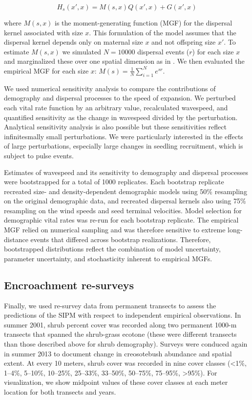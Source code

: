 \documentclass[11pt]{article}\usepackage[]{graphicx}\usepackage[usenames,dvipsnames]{xcolor}
\begin{document}
\begin{linenomath*} 
\begin{equation} 
H_{s}(x\prime,x) = M(s,x)Q(x\prime,x) + G(x\prime,x)
\end{equation} 
\end{linenomath*}

where $M(s,x)$ is the moment-generating function (MGF) for the dispersal kernel associated with size $x$.
This formulation of the model assumes that the dispersal kernel depends only on maternal size $x$ and not offspring size $x\prime$.
To estimate $M(s,x)$ we simulated $N=10000$ dispersal events ($r$) for each size $x$ and marginalized these over one spatial dimension as in \cite{lewis2006guide}.
We then evaluated the empirical MGF for each size $x$: $M(s)=\frac{1}{N} \sum_{i=1}^{N}e^{sr}$. 

We used numerical sensitivity analysis to compare the contributions of demography and dispersal processes to the speed of expansion. 
We perturbed each vital rate function by an arbitrary value, recalculated wavespeed, and quantified sensitivity as the change in wavespeed divided by the perturbation. 
Analytical sensitivity analysis is also possible \citep{ellner2016data} but these sensitivities reflect infinitesmally small perturbations.
We were particularly interested in the effects of large perturbations, especially large changes in seedling recruitment, which is subject to pulse events. 

Estimates of wavespeed and its sensitivity to demography and dispersal processes were bootstrapped for a total of 1000 replicates.
Each bootstrap replicate recreated size- and density-dependent demographic models using 50\% resampling on the original demographic data, and recreated dispersal kernels also using 75\% resampling on the wind speeds and seed terminal velocities.
Model selection for demographic vital rates was re-run for each bootstrap replicate. 
The empirical MGF relied on numerical sampling and was therefore sensitive to extreme long-distance events that differed across bootstrap realizations. 
Therefore, bootstrapped distributions reflect the combination of model uncertainty, parameter uncertainty, and stochasticity inherent to empirical MGFs. 

\subsection*{Encroachment re-surveys}
Finally, we used re-survey data from permanent transects to assess the predictions of the SIPM with respect to independent empirical observations. 
In summer 2001, shrub percent cover was recorded along two permanent 1000-m transects that spanned the shrub-grass ecotone (these were different transects than those described above for shrub demography). 
Surveys were conduced again in summer 2013 to document change in creosotebush abundance and spatial extent. 
At every 10 meters, shrub cover was recorded in nine cover classes (<1\%, 1--4\%, 5--10\%, 10--25\%, 25--33\%, 33--50\%, 50--75\%, 75--95\%, >95\%). 
For visualization, we show midpoint values of these cover classes at each meter location for both transects and years. 
\end{document}
